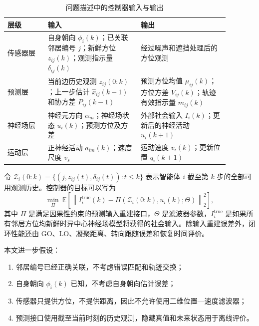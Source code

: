 \documentclass[UTF8,fontset=windows,11pt]{ctexart}
\begin{document}
\begin{table}[htbp]
 \centering
 \small
 \caption{问题描述中的控制器输入与输出}
 \label{tab:problem_io}
 \begin{tabular}{>{\raggedright\arraybackslash}p{0.16\linewidth}
                 >{\raggedright\arraybackslash}p{0.37\linewidth}
                 >{\raggedright\arraybackslash}p{0.35\linewidth}}
 \toprule
 层级 & 输入 & 输出\\
 \midrule
 传感器层 &
 自身朝向 $\phi_i(k)$；已关联邻居编号 $j$；新鲜方位 $z_{ij}(k)$；观测指示量 $\delta_{ij}(k)$ &
 经过噪声和遮挡处理后的方位观测\\
 预测层 &
 当前边历史观测 $z_{ij}(0:k)$；上一步估计 $\hat x_{ij}(k-1)$ 和协方差 $P_{ij}(k-1)$ &
 预测方位均值 $\mu_{ij}(k)$；方位方差 $V_{ij}(k)$；轨迹有效指示量 $m_{ij}(k)$\\
 神经场层 &
 神经元方向 $\alpha_m$；神经场状态 $u_i(k)$；预测方位及方差 &
 外部社会输入 $I_i(k)$；更新后的神经活动 $u_i(k+1)$\\
 运动层 &
 正神经活动 $a_{im}(k)$；速度尺度 $v_s$ &
 运动速度 $v_i(k)$；更新位置 $q_i(k+1)$\\
 \bottomrule
 \end{tabular}
\end{table}

令 $\mathcal Z_i(0:k)=\{(j,z_{ij}(t),\delta_{ij}(t)):t\le k\}$ 表示智能体 $i$ 截至第 $k$ 步的全部可用观测历史。控制器的目标可以写为
\begin{equation}
 \min_{\Pi}\ \mathbb E\left[
 \left\|I_i^{\mathrm{true}}(k)-\Pi(\mathcal Z_i(0:k),u_i(k);\Theta)\right\|_2^2
 \right],
\end{equation}
其中 $\Pi$ 是满足因果性约束的预测输入重建接口，$\Theta$ 是滤波器参数，$I_i^{\mathrm{true}}$ 是如果所有邻居方位均新鲜时异中心神经场模型将获得的社会输入。除输入重建误差外，闭环性能还由 GO、LO、凝聚距离、转向跟随误差和恢复时间评价。

本文进一步假设：

\begin{enumerate}[label=(\arabic*)]
 \item 邻居编号已经正确关联，不考虑错误匹配和轨迹交换；
 \item 自身朝向 $\phi_i(k)$ 已知，不考虑自身朝向估计误差；
 \item 传感器只提供方位，不提供距离，因此不允许使用二维位置—速度滤波器；
 \item 预测接口使用截至当前时刻的历史观测，隐藏真值和未来状态用于离线评价。
\end{enumerate}
\end{document}
